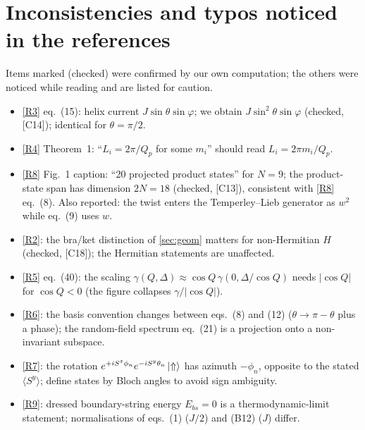 \documentclass[11pt,a4paper]{article}
\theoremstyle{definition}
\newcommand{\ver}[1]{\textsf{[#1]}}   %
\begin{document}
\section{Inconsistencies and typos noticed in the references}\label{app:errata}
Items marked (checked) were confirmed by our own computation; the others were noticed while reading and are listed for caution.
\begin{itemize}
\item \ref{R3} eq.~(15): helix current $J\sin\theta\sin\varphi$; we obtain $J\sin^2\theta\sin\varphi$ (checked, \ver{C14}); identical for $\theta=\pi/2$.
\item \ref{R4} Theorem~1: ``$L_i=2\pi/Q_p$ for some $m_i$'' should read $L_i=2\pi m_i/Q_p$.
\item \ref{R8} Fig.~1 caption: ``20 projected product states'' for $N=9$; the product-state span has dimension $2N=18$ (checked, \ver{C13}), consistent with \ref{R8} eq.~(8). Also reported: the twist enters the Temperley--Lieb generator as $w^2$ while eq.~(9) uses $w$.
\item \ref{R2}: the bra/ket distinction of \cref{sec:geom} matters for non-Hermitian $H$ (checked, \ver{C18}); the Hermitian statements are unaffected.
\item \ref{R5} eq.~(40): the scaling $\gamma(Q,\Delta)\approx\cos Q\,\gamma(0,\Delta/\cos Q)$ needs $|\cos Q|$ for $\cos Q<0$ (the figure collapses $\gamma/|\cos Q|$).
\item \ref{R6}: the basis convention changes between eqs.~(8) and (12) ($\theta\to\pi-\theta$ plus a phase); the random-field spectrum eq.~(21) is a projection onto a non-invariant subspace.
\item \ref{R7}: the rotation $e^{+iS^z\phi_n}e^{-iS^y\theta_n}\ket\Uparrow$ has azimuth $-\phi_n$, opposite to the stated $\langle S^y\rangle$; define states by Bloch angles to avoid sign ambiguity.
\item \ref{R9}: dressed boundary-string energy $E_{bs}=0$ is a thermodynamic-limit statement; normalisations of eqs.~(1) ($J/2$) and (B12) ($J$) differ.
\end{itemize}
\end{document}
